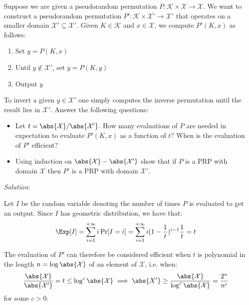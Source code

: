 \documentclass[a4paper, 12pt]{report}
\begin{document}
    \begin{framedprob}{}
        Suppose we are given a pseudorandom permutation $P : \mathcal{K} \times \mathcal{X} \to \mathcal{X}$. We want to construct a pseudorandom permutation $P' : \mathcal{K} \times \mathcal{X}' \to \mathcal{X}'$ that operates on a smaller domain $\mathcal{X}' \subseteq \mathcal{X}'$. Given $K \in \mathcal{K}$ and $x \in \mathcal{X}$, we compute $P'(K,x)$ as follows:
        \begin{enumerate}
            \item Set $y = P(K,x)$
            \item Until $y \notin \mathcal{X}'$, set $y = P(K,y)$
            \item Output $y$
        \end{enumerate}

        To invert a given $y \in \mathcal{X}'$ one simply computes the inverse permutation until the result lies in $\mathcal{X}'$. Answer the following questions:
        \begin{itemize}
            \item Let $t = \abs{\mathcal{X}}/\abs{\mathcal{X}'}$. How many evaluations of $P$ are needed in expectation to evaluate $P'(K,x)$ as a function of $t$? When is the evaluation of $P'$ efficient?
            \item Using induction on $\abs{\mathcal{X}}- \abs{\mathcal{X}'}$ show that if $P$ is a PRP with domain $\mathcal{X}$ then $P'$ is a PRP with domain $\mathcal{X}'$.
        \end{itemize}
    \end{framedprob}


    \textit{Solution}:

    Let $I$ be the random variable denoting the number of times $P$ is evaluated to get an output. Since $I$ has geometric distribution, we have that:
    \[\Exp[I] = \sum_{i = 1}^{+\infty} i \Pr[I = i] = \sum_{i = 1}^{+\infty} i (1-\frac{1}{t})^{i-1}\frac{1}{t} = t\]

    The evaluation of $P'$ can therefore be considered efficient when $t$ is polynomial in the length $n = \log \abs{\mathcal{X}}$ of an element of $\mathcal{X}$, i.e. when:
    \[\frac{\abs{\mathcal{X}}}{\abs{\mathcal{X}'}} = t \leq \log^c \abs{\mathcal{X}} \implies \abs{X'} \geq \frac{\abs{\mathcal{X}}}{\log^c \abs{\mathcal{X}}} = \frac{2^n}{n^c}\]
    for some $c > 0$.
    
\end{document}
